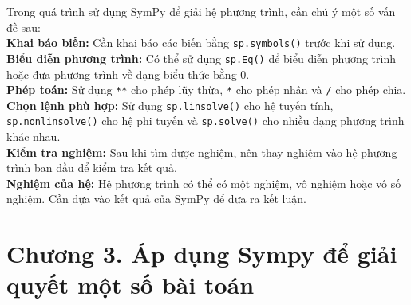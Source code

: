 \documentclass[13pt,a4paper]{article}
\begin{document}
Trong quá trình sử dụng SymPy để giải hệ phương trình, cần chú ý một số vấn đề sau:\\
\textbf{Khai báo biến:} Cần khai báo các biến bằng \texttt{sp.symbols()} trước khi sử dụng.\\
\textbf{Biểu diễn phương trình:} Có thể sử dụng \texttt{sp.Eq()} để biểu diễn phương trình hoặc đưa phương trình về dạng biểu thức bằng $0$.\\
\textbf{Phép toán:} Sử dụng \texttt{**} cho phép lũy thừa, \texttt{*} cho phép nhân và \texttt{/} cho phép chia.\\
\textbf{Chọn lệnh phù hợp:} Sử dụng \texttt{sp.linsolve()} cho hệ tuyến tính, \texttt{sp.nonlinsolve()} cho hệ phi tuyến và \texttt{sp.solve()} cho nhiều dạng phương trình khác nhau.\\
\textbf{Kiểm tra nghiệm:} Sau khi tìm được nghiệm, nên thay nghiệm vào hệ phương trình ban đầu để kiểm tra kết quả.\\
\textbf{Nghiệm của hệ:} Hệ phương trình có thể có một nghiệm, vô nghiệm hoặc vô số nghiệm. Cần dựa vào kết quả của SymPy để đưa ra kết luận.















\section{Chương 3. Áp dụng Sympy để giải quyết một số bài toán}
\end{document}

